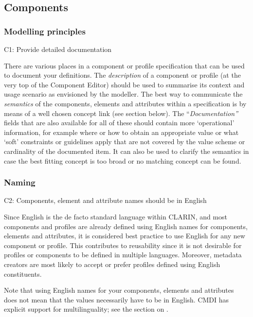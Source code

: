 \subsection{Components}\label{components}

\subsubsection{Modelling principles}\label{modelling-principles}

C1: Provide detailed documentation


There are various places in a component or profile specification that can be used to document your definitions. The \emph{description} of a component or profile (at the very top of the Component Editor) should be used to summarise its context and usage scenario as envisioned by the modeller. The best way to communicate the \emph{semantics} of the components, elements and attributes within a specification is by means of a well chosen concept link (see section  below). The ``\emph{Documentation''} fields that are also available for all of these should contain more `operational' information, for example where or how to obtain an appropriate value or what `soft' constraints or guidelines apply that are not covered by the value scheme or cardinality of the documented item. It can also be used to clarify the
semantics in case the best fitting concept is too broad or no matching concept can be found.

\subsubsection{Naming}\label{naming}

C2: Components, element and attribute names should be in English


Since English is the de facto standard language within CLARIN, and most components and profiles are already defined using English names for components, elements and attributes, it is considered best practice to use English for any new component or profile. This contributes to reusability since it is not desirable for profiles or components to be defined in multiple languages. Moreover, metadata creators are most likely to accept or prefer profiles defined using English constituents.

Note that using English names for your components, elements and attributes does not mean that the values necessarily have to be in English. CMDI has explicit support for multilinguality; see the section on .

